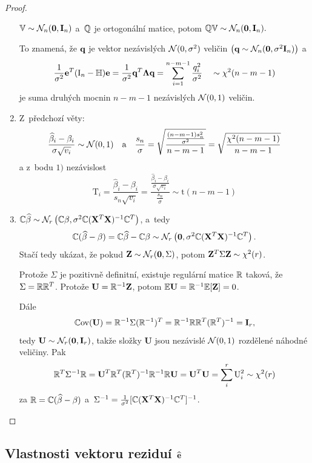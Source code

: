 \begin{proof}
\begin{enumerate}
\begin{theorem}
	 $\mathbb{V} \sim \mathcal{N}_n (\boldsymbol{0}, \mathbf{I}_n)$ a~$\mathbb{Q}$ je ortogonální matice, potom $\mathbb{Q} \mathbb{V} \sim \mathcal{N}_n (\boldsymbol{0}, \mathbf{I}_n).$
\end{theorem}
\vspace{0.1cm}
To znamená, že $\textbf{q}$ je vektor nezávislých $\mathcal{N}(0,\sigma^2)$ veličin $\left(\textbf{q} \sim \mathcal{N}_n (\boldsymbol{0}, \sigma^2 \mathbf{I}_n)\right)$ a
 $$ \frac{1}{\sigma^2} \mathbf{e}^T (\text{I}_n - \mathbb{H}) \mathbf{e} = \frac{1}{\sigma^2} \textbf{q}^T \mathbf{\Lambda} \textbf{q} = \sum_{i = 1}^{n-m-1}\frac{q_i^2}{\sigma^2} \quad \sim \chi^2 (n - m - 1) $$
je suma druhých mocnin $n-m-1$ nezávislých $\mathcal{N}(0,1)$ veličin.
\item Z~předchozí věty:
 $$
  \frac{\widehat{\beta}_i - \beta_i}{\sigma \sqrt{v_i}} \sim \mathcal{N}(0,1) \quad \text{a} \quad \frac{s_n}{\sigma} = \sqrt{\frac{\frac{(n-m-1) s_n^2}{\sigma^2}}{n-m-1}} = \sqrt{\frac{\chi^2(n-m-1)}{n-m-1}}
 $$
a z~bodu $1)$ nezávislost
 $$
  \text{T}_i = \frac{\widehat{\beta}_i - \beta_i}{s_n \sqrt{v_i}} = \frac{\frac{\widehat{\beta}_i - \beta_i}{\sigma \sqrt{v_i}}}{\frac{s_n}{\sigma}} \sim \mathrm{t}(n-m-1)
 $$
\item
 $\mathbb{C} \widehat{\beta} \sim \mathcal{N}_r \left(\mathbb{C} \beta, \sigma^2 \mathbb{C} (\mathbf{X}^T \mathbf{X})^{-1} \mathbb{C}^T \right)$, a~tedy
 $$ \mathbb{C} (\widehat{\beta} - \beta) = \mathbb{C}\widehat{\beta} - \mathbb{C} \beta \sim \mathcal{N}_r \left(\boldsymbol{0}, \sigma^2 \mathbb{C} (\mathbf{X}^T \mathbf{X})^{-1} \mathbb{C}^T\right). $$
Stačí tedy ukázat, že pokud $\mathbf{Z} \sim \mathcal{N}_r (\boldsymbol{0}, \Sigma)$, potom $\mathbf{Z}^T \Sigma \mathbf{Z} \sim \chi^2(r)$.

Protože $\Sigma$ je pozitivně definitní, existuje regulární matice $\mathbb{R}$ taková, že $\Sigma = \mathbb{R}\mathbb{R}^T$. Protože $\textbf{U} = \mathbb{R}^{-1} \mathbf{Z}$, potom $\mathbb{E} \textbf{U} = \mathbb{R}^{-1} \mathbb{E} [\mathbf{Z}] = 0$.

Dále
$$\mathbb{C}\mathrm{ov}(\textbf{U}) = \mathbb{R}^{-1} \Sigma (\mathbb{R}^{-1})^T = \mathbb{R}^{-1} \mathbb{R}\mathbb{R}^T (\mathbb{R}^T)^{-1} = \textbf{I}_r,$$
 tedy $\textbf{U} \sim \mathcal{N}_r (\boldsymbol{0}, \textbf{I}_r)$, takže složky \textbf{U} jsou nezávislé $\mathcal{N}(0,1)$ rozdělené náhodné veličiny. Pak
 $$ \mathbb{R}^T \Sigma^{-1} \mathbb{R} = \textbf{U}^T \mathbb{R}^T (\mathbb{R}^T)^{-1} \mathbb{R}^{-1} \mathbb{R} \textbf{U} = \textbf{U}^T \textbf{U} = \sum_i^r \text{U}_i^2 \sim \chi^2(r) $$
za $\mathbb{R} = \mathbb{C} (\widehat{\beta} - \beta)$ a~$\Sigma^{-1} = \frac{1}{\sigma^2} [\mathbb{C} (\mathbf{X}^T \mathbf{X})^{-1} \mathbb{C}^T]^{-1}$.

\end{enumerate}
\end{proof}

\subsection{Vlastnosti vektoru reziduí $\widehat{\mathbf{e}}$ }

